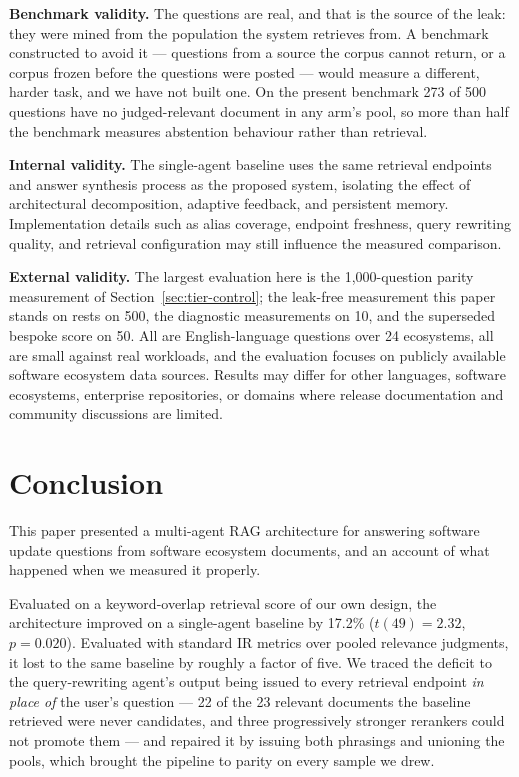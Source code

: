 \documentclass[acmsmall,review,anonymous,screen]{acmart}
\begin{document}
\textbf{Benchmark validity.}
The questions are real, and that is the source of the leak: they were mined
from the population the system retrieves from. A benchmark constructed to avoid
it --- questions from a source the corpus cannot return, or a corpus frozen
before the questions were posted --- would measure a different, harder task, and
we have not built one. On the present benchmark 273 of 500 questions have no
judged-relevant document in any arm's pool, so more than half the benchmark
measures abstention behaviour rather than retrieval.

\textbf{Internal validity.}
The single-agent baseline uses the same retrieval endpoints and answer
synthesis process as the proposed system, isolating the effect of
architectural decomposition, adaptive feedback, and persistent memory.
Implementation details such as alias coverage, endpoint freshness,
query rewriting quality, and retrieval configuration may still
influence the measured comparison.

\textbf{External validity.}
The largest evaluation here is the 1{,}000-question parity measurement of
Section~\ref{sec:tier-control}; the leak-free measurement this paper stands on
rests on 500, the diagnostic measurements on 10, and the superseded bespoke
score on 50. All are English-language questions over 24 ecosystems, all are
small against real workloads, and the evaluation focuses on publicly available
software ecosystem data sources. Results may
differ for other languages, software ecosystems, enterprise
repositories, or domains where release documentation and community
discussions are limited.

\section{Conclusion}\label{sec:conclusion}

This paper presented a multi-agent RAG architecture for answering software
update questions from software ecosystem documents, and an account of what
happened when we measured it properly.

Evaluated on a keyword-overlap retrieval score of our own design, the
architecture improved on a single-agent baseline by 17.2\% ($t(49)=2.32$,
$p=0.020$). Evaluated with standard IR metrics over pooled relevance judgments,
it lost to the same baseline by roughly a factor of five. We traced the deficit
to the query-rewriting agent's output being issued to every retrieval endpoint
\emph{in place of} the user's question --- 22 of the 23 relevant documents the
baseline retrieved were never candidates, and three progressively stronger
rerankers could not promote them --- and repaired it by issuing both phrasings
and unioning the pools, which brought the pipeline to parity on every sample we
drew.
\end{document}
